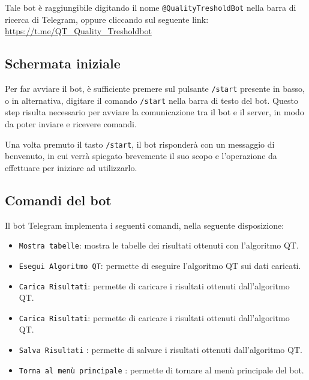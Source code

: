 Tale bot è raggiungibile digitando il nome \texttt{@QualityTresholdBot} nella barra di ricerca di Telegram, oppure cliccando sul seguente link: \url{https://t.me/QT_Quality_Tresholdbot}

\subsection{Schermata iniziale}

Per far avviare il bot, è sufficiente premere sul pulsante \texttt{/start} presente in basso, o in alternativa, digitare il comando \texttt{/start} nella barra di testo del bot. Questo step risulta necessario per avviare la comunicazione tra il bot e il server, in modo da poter inviare e ricevere comandi.


Una volta premuto il tasto \texttt{/start}, il bot risponderà con un messaggio di benvenuto, in cui verrà spiegato brevemente il suo scopo e l'operazione da effettuare per iniziare ad utilizzarlo.

\label{Schermata iniziale}

\subsection{Comandi del bot}

Il bot Telegram implementa i seguenti comandi, nella seguente disposizione:

\begin{multicols}{2}
        \begin{itemize}
            \item \texttt{Mostra tabelle}: mostra le tabelle dei risultati ottenuti con l'algoritmo QT.
            \item \texttt{Esegui Algoritmo QT}: permette di eseguire l'algoritmo QT sui dati caricati.
            \item \texttt{Carica Risultati}: permette di caricare i risultati ottenuti dall'algoritmo QT.
            \item \texttt{Carica Risultati}: permette di caricare i risultati ottenuti dall'algoritmo QT.
            \item \texttt{Salva Risultati} : permette di salvare i risultati ottenuti dall'algoritmo QT.
            \item \texttt{Torna al menù principale} : permette di tornare al menù principale del bot.
        \end{itemize}
\end{multicols}

